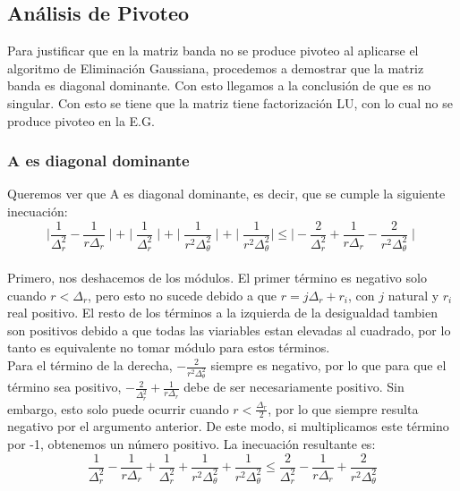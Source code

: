 
\subsection{Análisis de Pivoteo}

Para justificar que en la matriz banda no se produce pivoteo al aplicarse el algoritmo de Eliminación Gaussiana, procedemos a demostrar que la matriz banda es diagonal dominante. Con esto llegamos a la conclusión de que es no singular. Con esto se tiene  que la matriz tiene factorización LU, con lo cual no se produce pivoteo en la E.G.




\subsubsection{A es diagonal dominante}
Queremos ver que A es diagonal dominante, es decir, que se cumple la siguiente inecuación:\\
$$\mid \frac{1}{\Delta^2_r}-\frac{1}{r \Delta_r}\mid +
\mid \frac{1}{\Delta^2_r} \mid + 
\mid \frac{1}{r^2 \Delta^2_\theta} \mid +
\mid \frac{1}{r^2 \Delta^2_\theta} \mid
\leq \mid -\frac{2}{\Delta^2_r}+\frac{1}{r \Delta_r}-\frac{2}{r^2 \Delta^2_\theta} \mid$$  \\
Primero, nos deshacemos de los módulos. El primer término es negativo solo cuando $r < {\Delta_r}$, pero esto no sucede debido a que $r= j \Delta_r + r_i$, con $j$ natural y $r_i$ real positivo. El resto de los términos a la izquierda de la desigualdad tambien son positivos debido a que todas las viariables estan elevadas al cuadrado, por lo tanto es equivalente no tomar módulo para estos términos. \\
Para el término de la derecha, $-\frac{2}{r^2 \Delta^2_\theta}$ siempre es negativo, por lo que para que el término sea positivo, $-\frac{2}{\Delta^2_r}+\frac{1}{r \Delta_r}$ debe de ser necesariamente positivo. Sin embargo, esto solo puede ocurrir cuando $r < \frac{\Delta_r}{2}$, por lo que siempre resulta negativo por el argumento anterior. De este modo, si multiplicamos este término por -1, obtenemos un número positivo. La inecuación resultante es: \\ 
$$ \frac{1}{\Delta^2_r}-\frac{1}{r \Delta_r} +  
\frac{1}{\Delta^2_r} + 
\frac{1}{r^2 \Delta^2_\theta} +
\frac{1}{r^2 \Delta^2_\theta}
\leq \frac{2}{\Delta^2_r}-\frac{1}{r \Delta_r}+\frac{2}{r^2 \Delta^2_\theta}$$ \\

